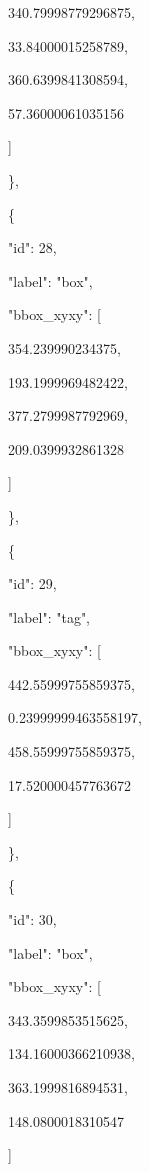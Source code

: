 \documentclass[10pt,a4paper]{article}
\begin{document}
        340.79998779296875,\allowbreak{}\par
        33.84000015258789,\allowbreak{}\par
        360.6399841308594,\allowbreak{}\par
        57.36000061035156\par
      ]\par
    \},\allowbreak{}\par
    \{\par
      "id":\allowbreak{} 28,\allowbreak{}\par
      "label":\allowbreak{} "box",\allowbreak{}\par
      "bbox\_xyxy":\allowbreak{} [\par
        354.239990234375,\allowbreak{}\par
        193.1999969482422,\allowbreak{}\par
        377.2799987792969,\allowbreak{}\par
        209.0399932861328\par
      ]\par
    \},\allowbreak{}\par
    \{\par
      "id":\allowbreak{} 29,\allowbreak{}\par
      "label":\allowbreak{} "tag",\allowbreak{}\par
      "bbox\_xyxy":\allowbreak{} [\par
        442.55999755859375,\allowbreak{}\par
        0.23999999463558197,\allowbreak{}\par
        458.55999755859375,\allowbreak{}\par
        17.520000457763672\par
      ]\par
    \},\allowbreak{}\par
    \{\par
      "id":\allowbreak{} 30,\allowbreak{}\par
      "label":\allowbreak{} "box",\allowbreak{}\par
      "bbox\_xyxy":\allowbreak{} [\par
        343.3599853515625,\allowbreak{}\par
        134.16000366210938,\allowbreak{}\par
        363.1999816894531,\allowbreak{}\par
        148.0800018310547\par
      ]\par
\end{document}
